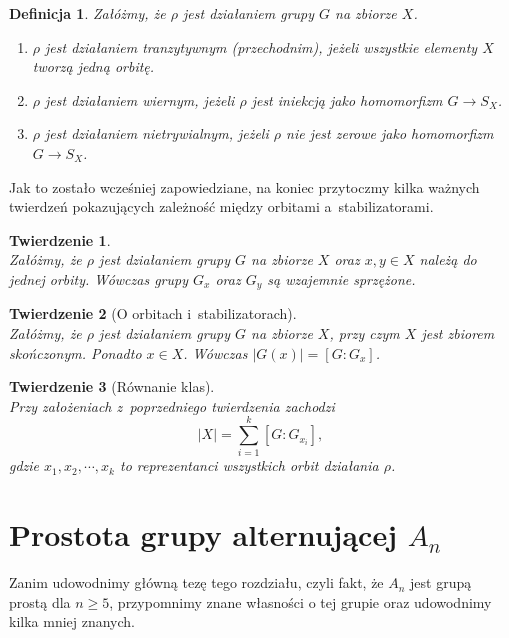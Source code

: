 \documentclass[licencjacka]{pracamgr}
\newtheorem{deff}{Definicja}[section]
\newtheorem{thh}{Twierdzenie}[section]
\begin{document}
\begin{deff}
	Załóżmy, że $\rho$ jest działaniem grupy $G$ na zbiorze $X$.
	\begin{enumerate}[label=\alph*)]
	 \item \emph{$\rho$ jest działaniem tranzytywnym (przechodnim)}, jeżeli wszystkie elementy $X$ tworzą jedną orbitę.
	 \item \emph{$\rho$ jest działaniem wiernym}, jeżeli $\rho$ jest iniekcją jako homomorfizm $G \to S_X$.
	 \item \emph{$\rho$ jest działaniem nietrywialnym}, jeżeli $\rho$ nie jest zerowe jako homomorfizm $G \to S_X$.
	\end{enumerate}
\end{deff}

Jak to zostało wcześniej zapowiedziane, na koniec przytoczmy kilka ważnych twierdzeń pokazujących zależność między orbitami a~stabilizatorami.

\begin{thh}\label{conj_stab} $ $\\
	Załóżmy, że $\rho$ jest działaniem grupy $G$ na zbiorze $X$ oraz $x, y \in X$ należą do jednej orbity.
	Wówczas grupy $G_x$ oraz $G_y$ są wzajemnie sprzężone.
\end{thh}

\begin{thh}[O orbitach i~stabilizatorach] $ $\\
	Załóżmy, że $\rho$ jest działaniem grupy $G$ na zbiorze $X$, przy czym $X$ jest zbiorem skończonym.
	Ponadto $x \in X$. 
	Wówczas $|G(x)| = [G : G_x]$.
\end{thh}

\begin{thh}[Równanie klas] $ $\\
	Przy założeniach z~poprzedniego twierdzenia zachodzi
	$$ |X| = \sum_{i=1}^k [G : G_{x_i}] ,$$
	gdzie $x_1, x_2, \cdots, x_k$ to reprezentanci wszystkich orbit działania $\rho$.
\end{thh}



\chapter{Prostota grupy alternującej $A_n$}

Zanim udowodnimy główną tezę tego rozdziału, czyli fakt, że $A_n$ jest grupą prostą dla $n \ge 5$,
przypomnimy znane własności o tej grupie oraz udowodnimy kilka mniej znanych.
\end{document}
